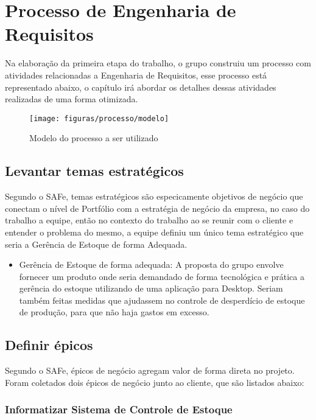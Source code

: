 \chapter{Processo de Engenharia de Requisitos}

Na elaboração da primeira etapa do trabalho, o grupo construiu um processo com atividades relacionadas a Engenharia de Requisitos, esse processo está representado abaixo, o capítulo irá abordar os detalhes dessas atividades realizadas de uma forma otimizada.

\begin{figure}[!htpb]
\centering
\texttt{[image: figuras/processo/modelo]}
\caption{Modelo do processo a ser utilizado}
\end{figure}

\newpage

\section{Levantar temas estratégicos}

Segundo o SAFe, temas estratégicos são especicamente objetivos de negócio que conectam o nível de Portfólio com a estratégia de negócio da empresa, no caso do trabalho a equipe, então no contexto do trabalho ao se reunir com o cliente e entender o problema do mesmo, a equipe definiu um único tema estratégico que seria a Gerência de Estoque de forma Adequada.

\begin{itemize}
\item Gerência de Estoque de forma adequada: A proposta do grupo envolve fornecer um produto onde seria demandado de forma tecnológica e prática a gerência do estoque utilizando de uma aplicação para Desktop. Seriam também feitas medidas que ajudassem no controle de desperdício de estoque de produção, para que não haja gastos em excesso.
\end{itemize}

\section{Definir épicos}
Segundo o SAFe, épicos de negócio agregam valor de forma direta no projeto. Foram coletados dois épicos de negócio junto ao cliente, que são listados abaixo:


\subsection{Informatizar Sistema de Controle de Estoque}

